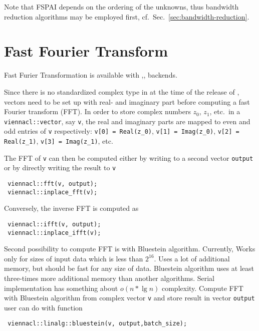 Note that FSPAI depends on the ordering of the unknowns, thus bandwidth reduction algorithms may be employed first, cf.~Sec.~\ref{sec:bandwidth-reduction}.


\section{Fast Fourier Transform}

Fast Furier Transformation is available with {\OpenCL},{\CUDA},{\OpenMP} backends.

Since there is no standardized complex type in {\OpenCL} at the time of the release of {\ViennaCLversion}, vectors need to be set up with real- and imaginary
part before computing a fast Fourier transform (FFT). In order to store complex numbers $z_0$, $z_1$, etc.~in a \lstinline|viennacl::vector|, say \lstinline|v|,
the real and imaginary parts are mapped to even and odd entries of \lstinline|v| respectively: \lstinline|v[0] = Real(z_0)|, \lstinline|v[1] = Imag(z_0)|,
\lstinline|v[2] = Real(z_1)|, \lstinline|v[3] = Imag(z_1)|, etc.

The FFT of \lstinline|v| can then be computed either by writing to a second vector \lstinline|output| or by directly writing the result to \lstinline|v|
\begin{lstlisting}
 viennacl::fft(v, output);
 viennacl::inplace_fft(v);
\end{lstlisting}
Conversely, the inverse FFT is computed as
\begin{lstlisting}
 viennacl::ifft(v, output);
 viennacl::inplace_ifft(v);
\end{lstlisting}

Second possibility to compute FFT is with Bluestein algorithm. Currently,  Works only for sizes of input data which is less than $2^{16}$. Uses a lot of additional memory, but should be fast for any size of data. Bluestein algorithm uses at least three-times more additional memory than another algorithms. Serial implementation has something about $o(n * \lg n)$ complexity.
Compute FFT with Bluestein algorithm from complex vector \lstinline|v| and store result in vector \lstinline|output| user can do with function
\begin{lstlisting}
 viennacl::linalg::bluestein(v, output,batch_size);
\end{lstlisting}


